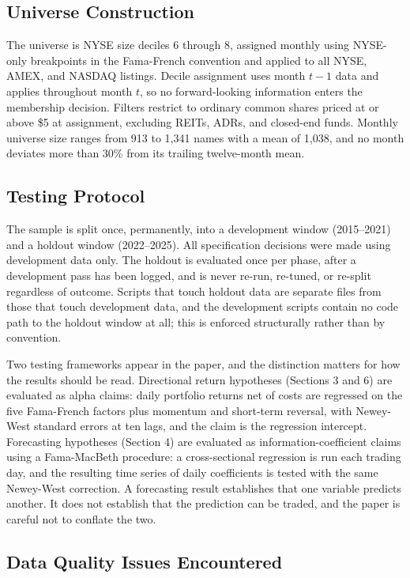 \documentclass[11pt]{article}
\begin{document}
\subsection{Universe Construction}

The universe is NYSE size deciles 6 through 8, assigned monthly using NYSE-only breakpoints in the Fama-French convention and applied to all NYSE, AMEX, and NASDAQ listings. Decile assignment uses month $t-1$ data and applies throughout month $t$, so no forward-looking information enters the membership decision. Filters restrict to ordinary common shares priced at or above \$5 at assignment, excluding REITs, ADRs, and closed-end funds. Monthly universe size ranges from 913 to 1,341 names with a mean of 1,038, and no month deviates more than 30\% from its trailing twelve-month mean.

\subsection{Testing Protocol}

The sample is split once, permanently, into a development window (2015--2021) and a holdout window (2022--2025). All specification decisions were made using development data only. The holdout is evaluated once per phase, after a development pass has been logged, and is never re-run, re-tuned, or re-split regardless of outcome. Scripts that touch holdout data are separate files from those that touch development data, and the development scripts contain no code path to the holdout window at all; this is enforced structurally rather than by convention.

Two testing frameworks appear in the paper, and the distinction matters for how the results should be read. Directional return hypotheses (Sections 3 and 6) are evaluated as alpha claims: daily portfolio returns net of costs are regressed on the five Fama-French factors plus momentum and short-term reversal, with Newey-West standard errors at ten lags, and the claim is the regression intercept. Forecasting hypotheses (Section 4) are evaluated as information-coefficient claims using a Fama-MacBeth procedure: a cross-sectional regression is run each trading day, and the resulting time series of daily coefficients is tested with the same Newey-West correction. A forecasting result establishes that one variable predicts another. It does not establish that the prediction can be traded, and the paper is careful not to conflate the two.

\subsection{Data Quality Issues Encountered}
\end{document}
